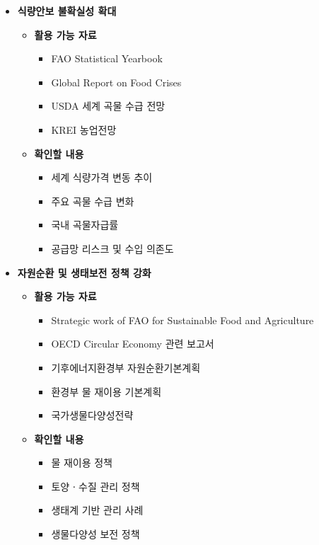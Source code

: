 \begin{itemize}
    \item \textbf{식량안보 불확실성 확대}

    \begin{itemize}
        \item \textbf{활용 가능 자료}
        \begin{itemize}
            \item FAO Statistical Yearbook
            \item Global Report on Food Crises
            \item USDA 세계 곡물 수급 전망
            \item KREI 농업전망
        \end{itemize}

        \item \textbf{확인할 내용}
        \begin{itemize}
            \item 세계 식량가격 변동 추이
            \item 주요 곡물 수급 변화
            \item 국내 곡물자급률
            \item 공급망 리스크 및 수입 의존도
        \end{itemize}
    \end{itemize}

    \item \textbf{자원순환 및 생태보전 정책 강화}

    \begin{itemize}
        \item \textbf{활용 가능 자료}
        \begin{itemize}
            \item Strategic work of FAO for Sustainable Food and Agriculture
            \item OECD Circular Economy 관련 보고서
            \item 기후에너지환경부 자원순환기본계획
            \item 환경부 물 재이용 기본계획
            \item 국가생물다양성전략
        \end{itemize}

        \item \textbf{확인할 내용}
        \begin{itemize}
            \item 물 재이용 정책
            \item 토양ㆍ수질 관리 정책
            \item 생태계 기반 관리 사례
            \item 생물다양성 보전 정책
        \end{itemize}
    \end{itemize}

\end{itemize}

